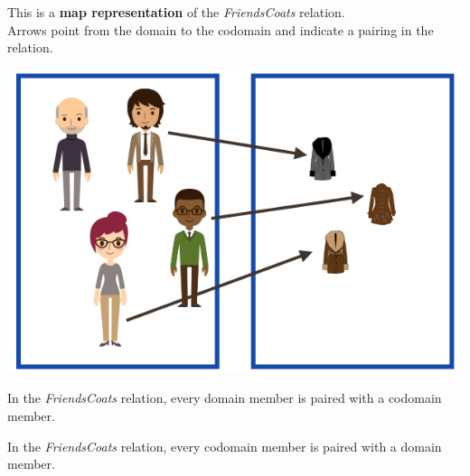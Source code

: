 \documentclass{ximera}
\author{Lee Wayand}
\begin{document}
\begin{exercise}

This is a \textbf{map representation} of the \textit{FriendsCoats} relation. \\


Arrows point from the domain to the codomain and indicate a pairing in the relation.


\begin{image}
\includegraphics{../../pics/func_maps/f_30.png}
\end{image}




\begin{question} 
In the \textit{FriendsCoats} relation, every domain member is paired with a codomain member.

\begin{multipleChoice}
\end{multipleChoice}
\end{question}







\begin{question} 
In the \textit{FriendsCoats} relation, every codomain member is paired with a domain member.

\begin{multipleChoice}
\end{multipleChoice}
\end{question}








\end{exercise}
\end{document}
